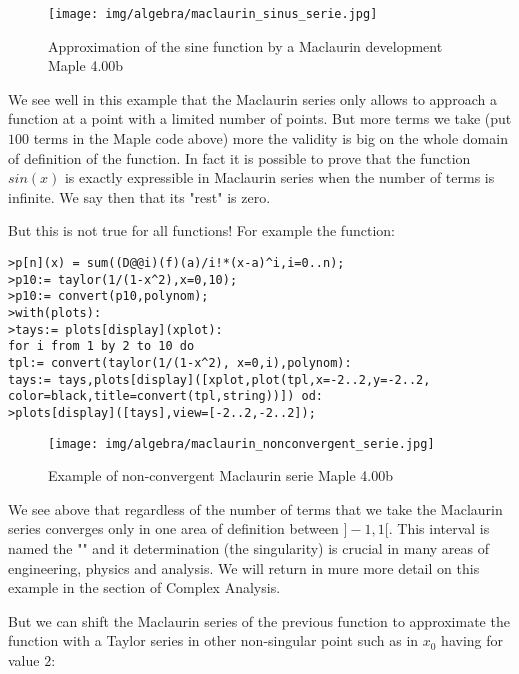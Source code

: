 	\begin{figure}[H]
		\centering
		\texttt{[image: img/algebra/maclaurin\_sinus\_serie.jpg]}
		\caption{Approximation of the sine function by a Maclaurin development Maple 4.00b}
	\end{figure}
	We see well in this example that the Maclaurin series only allows to approach a function at a point with a limited number of points. But more terms we take (put $100$ terms in the Maple code above) more the validity is big on the whole domain of definition of the function. In fact it is possible to prove that the function $sin (x)$ is exactly expressible in Maclaurin series when the number of terms is infinite. We say then that its "rest" is zero.
	
	But this is not true for all functions! For example the function:
	
	
	\texttt{>p[n](x) = sum((D@@i)(f)(a)/i!*(x-a)\string^i,i=0..n); \\
	>p10:= taylor(1/(1-x\string^2),x=0,10);\\
	>p10:= convert(p10,polynom);\\
	>with(plots):\\
	>tays:= plots[display](xplot):\\
	for i from 1 by 2 to 10 do\\
	tpl:= convert(taylor(1/(1-x\string^2), x=0,i),polynom):\\
	tays:= tays,plots[display]([xplot,plot(tpl,x=-2..2,y=-2..2,
	color=black,title=convert(tpl,string))]) od: \\
	>plots[display]([tays],view=[-2..2,-2..2]);}
	\begin{figure}[H]
		\centering
		\texttt{[image: img/algebra/maclaurin\_nonconvergent\_serie.jpg]}
		\caption{Example of non-convergent Maclaurin serie Maple 4.00b}
	\end{figure}
	We see above that regardless of the number of terms that we take the Maclaurin series converges only in one area of definition between $] -1,1 [$. This interval is named the "" and it determination (the singularity) is crucial in many areas of engineering, physics and analysis. We will return in mure more detail on this example in the section of Complex Analysis.
	
	But we can shift the Maclaurin series of the previous function to approximate the function with a Taylor series in other non-singular point such as in $x_0$ having for value $2$:
	
